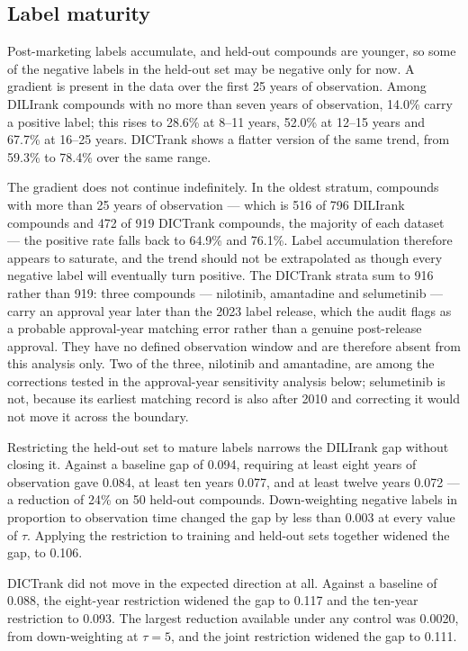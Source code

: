 \subsection{Label maturity}

Post-marketing labels accumulate, and held-out compounds are younger, so some of
the negative labels in the held-out set may be negative only for now. A gradient
is present in the data over the first 25 years of observation. Among DILIrank
compounds with no more than seven years of observation, 14.0\% carry a positive
label; this rises to 28.6\% at 8--11 years, 52.0\% at 12--15 years and 67.7\% at
16--25 years. DICTrank shows a flatter version of the same trend, from 59.3\% to
78.4\% over the same range.

The gradient does not continue indefinitely. In the oldest stratum, compounds with
more than 25 years of observation --- which is 516 of 796 DILIrank compounds and
472 of 919 DICTrank compounds, the majority of each dataset --- the positive rate
falls back to 64.9\% and 76.1\%. Label accumulation therefore appears to saturate,
and the trend should not be extrapolated as though every negative label will
eventually turn positive. The DICTrank strata sum to 916 rather than 919: three
compounds --- nilotinib, amantadine and selumetinib --- carry an approval year
later than the 2023 label release, which the audit flags as a probable
approval-year matching error rather than a genuine post-release approval. They
have no defined observation window and are therefore absent from this analysis
only. Two of the three, nilotinib and amantadine, are among the corrections tested
in the approval-year sensitivity analysis below; selumetinib is not, because its
earliest matching record is also after 2010 and correcting it would not move it
across the boundary.

Restricting the held-out set to mature labels narrows the DILIrank gap without
closing it. Against a baseline gap of 0.094, requiring at least eight years of
observation gave 0.084, at least ten years 0.077, and at least twelve years 0.072
--- a reduction of 24\% on 50 held-out compounds. Down-weighting negative labels
in proportion to observation time changed the gap by less than 0.003 at every
value of $\tau$. Applying the restriction to training and held-out sets together
widened the gap, to 0.106.

DICTrank did not move in the expected direction at all. Against a baseline of
0.088, the eight-year restriction widened the gap to 0.117 and the ten-year
restriction to 0.093. The largest reduction available under any control was
0.0020, from down-weighting at $\tau = 5$, and the joint restriction widened the
gap to 0.111.

